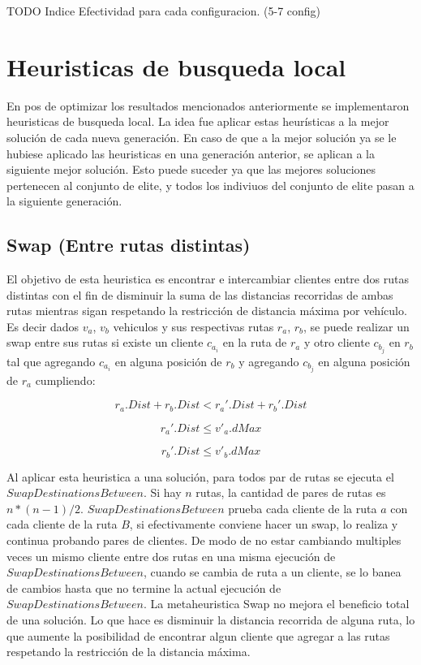 \bigskip

TODO Indice Efectividad para cada configuracion. (5-7 config)

\section{Heuristicas de busqueda local}

En pos de optimizar los resultados mencionados anteriormente se implementaron heuristicas de busqueda local. La idea fue aplicar estas heurísticas a la mejor solución de cada nueva generación. En caso de que a la mejor solución ya se le hubiese aplicado las heuristicas en una generación anterior, se aplican a la siguiente mejor solución. Esto puede suceder ya que las mejores soluciones pertenecen al conjunto de elite, y todos los indiviuos del conjunto de elite pasan a la siguiente generación.

\subsection{Swap (Entre rutas distintas)}

El objetivo de esta heuristica es encontrar e intercambiar clientes entre dos rutas distintas con el fin de disminuir la suma de las distancias recorridas de ambas rutas mientras sigan respetando la restricción de distancia máxima por vehículo. Es decir dados $v_a$, $v_b$ vehiculos y sus respectivas rutas $r_a$, $r_b$, se puede realizar un swap entre sus rutas si existe un cliente $c_{a_i}$ en la ruta de $r_a$ y otro cliente $c_{b_j}$ en $r_b$ tal que agregando $c_{a_i}$ en alguna posición de $r_b$ y agregando $c_{b_j}$ en alguna posición de $r_a$ cumpliendo:

\begin{equation*}
r_a.Dist + r_b.Dist < r_a'.Dist + r_b'.Dist \nonumber
\end{equation*}

\begin{equation*}
r_a'.Dist \leq v'_a.dMax
\end{equation*}

\begin{equation*}
r_b'.Dist \leq v'_b.dMax
\end{equation*}

Al aplicar esta heuristica a una solución, para todos par de rutas se ejecuta el $SwapDestinationsBetween$. Si hay $n$ rutas, la cantidad de pares de rutas es $n * (n-1) / 2$. $SwapDestinationsBetween$ prueba cada cliente de la ruta $a$ con cada cliente de la ruta $B$, si efectivamente conviene hacer un swap, lo realiza y continua probando pares de clientes. De modo de no estar cambiando multiples veces un mismo cliente entre dos rutas en una misma ejecución de $SwapDestinationsBetween$, cuando se cambia de ruta a un cliente, se lo banea de cambios hasta que no termine la actual ejecución de $SwapDestinationsBetween$. La metaheuristica Swap no mejora el beneficio total de una solución. Lo que hace es disminuir la distancia recorrida de alguna ruta, lo que aumente la posibilidad de encontrar algun cliente que agregar a las rutas respetando la restricción de la distancia máxima.

